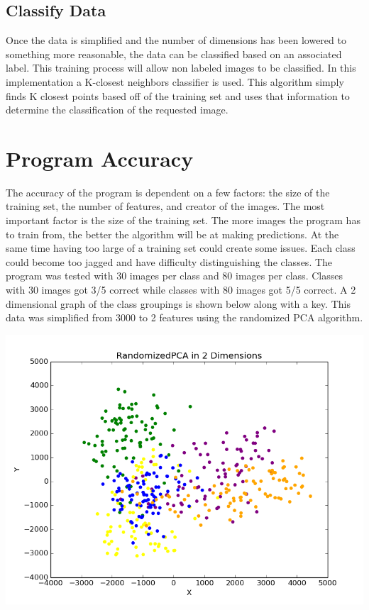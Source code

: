 \documentclass[paper=a4, fontsize=12pt]{scrartcl}
\numberwithin{equation}{section}		%
\numberwithin{figure}{section}			%
\numberwithin{table}{section}				%
\begin{document}
\subsection{Classify Data} 
Once the data is simplified and the number of dimensions has been lowered to something more reasonable, the data can be classified based on an associated label. This training process will allow non labeled images to be classified.
In this implementation a K-closest neighbors classifier is used. This algorithm simply finds K closest points based off of the training set and uses that information to determine the classification of the requested image.


\section{Program Accuracy}

The accuracy of the program is dependent on a few factors: the size of the training set, the number of features, and creator of the images. The most important factor is the size of the training set. The more images the program has to train from, the better the algorithm will be at making predictions. At the same time having too large of a training set could create some issues.  Each class could become too jagged and have difficulty distinguishing the classes. The program was tested with 30 images per class and 80 images per class. Classes with 30 images got 3/5 correct while classes with 80 images got 5/5 correct. A 2 dimensional graph of the class groupings is shown below along with a key. This data was simplified from 3000 to 2 features using the randomized PCA algorithm.

\includegraphics[width=\linewidth]{figure_1.png}
\end{document}
